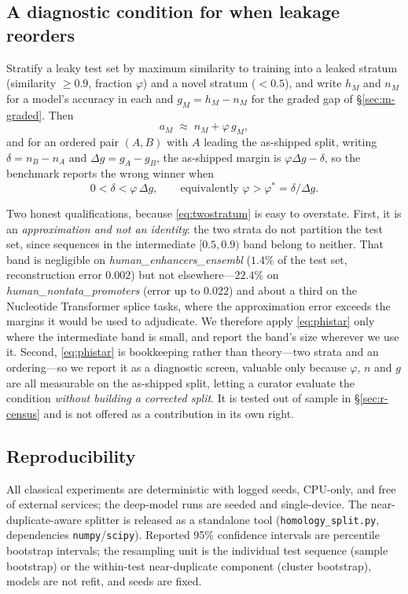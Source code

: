 \documentclass[webpdf,modern,large,namedate]{oup-authoring-template}%
\begin{document}
\subsection{A diagnostic condition for when leakage reorders}\label{sec:m-law}
Stratify a leaky test set by maximum similarity to training into a leaked stratum (similarity $\ge0.9$, fraction $\varphi$) and a novel stratum ($<0.5$), and write $h_M$ and $n_M$ for a model's accuracy in each and $g_M=h_M-n_M$ for the graded gap of \S\ref{sec:m-graded}. Then
\begin{equation}a_M\;\approx\;n_M+\varphi\,g_M,\label{eq:twostratum}\end{equation}
and for an ordered pair $(A,B)$ with $A$ leading the as-shipped split, writing $\delta=n_B-n_A$ and $\Delta g=g_A-g_B$, the as-shipped margin is $\varphi\Delta g-\delta$, so the benchmark reports the wrong winner when
\begin{equation}0<\delta<\varphi\,\Delta g,\qquad\text{equivalently }\varphi>\varphi^{*}=\delta/\Delta g.\label{eq:phistar}\end{equation}

Two honest qualifications, because \eqref{eq:twostratum} is easy to overstate. First, it is an \emph{approximation and not an identity}: the two strata do not partition the test set, since sequences in the intermediate $[0.5,0.9)$ band belong to neither. That band is negligible on \textit{human\_enhancers\_ensembl} ($1.4\%$ of the test set, reconstruction error $0.002$) but not elsewhere---$22.4\%$ on \textit{human\_nontata\_promoters} (error up to $0.022$) and about a third on the Nucleotide Transformer splice tasks, where the approximation error exceeds the margins it would be used to adjudicate. We therefore apply \eqref{eq:phistar} only where the intermediate band is small, and report the band's size wherever we use it. Second, \eqref{eq:phistar} is bookkeeping rather than theory---two strata and an ordering---so we report it as a diagnostic screen, valuable only because $\varphi$, $n$ and $g$ are all measurable on the as-shipped split, letting a curator evaluate the condition \emph{without building a corrected split}. It is tested out of sample in \S\ref{sec:r-census} and is not offered as a contribution in its own right.

\subsection{Reproducibility}
All classical experiments are deterministic with logged seeds, CPU-only, and free of external services; the deep-model runs are seeded and single-device. The near-duplicate-aware splitter is released as a standalone tool (\texttt{homology\_split.py}, dependencies \texttt{numpy}/\texttt{scipy}). Reported 95\% confidence intervals are percentile bootstrap intervals; the resampling unit is the individual test sequence (sample bootstrap) or the within-test near-duplicate component (cluster bootstrap), models are not refit, and seeds are fixed.
\end{document}
